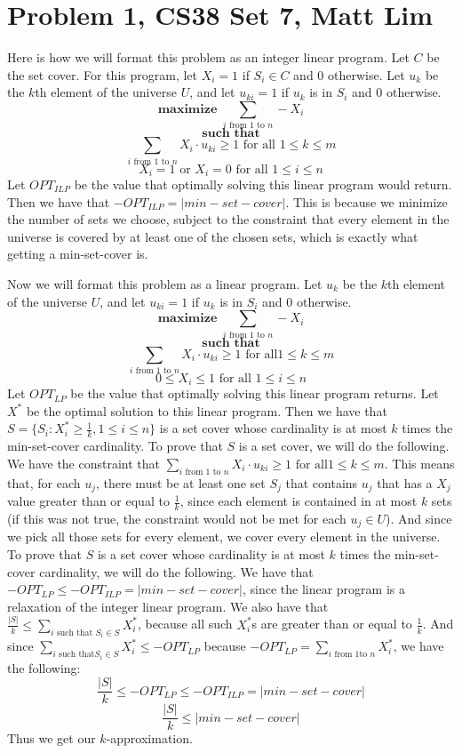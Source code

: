 \documentclass{article}
\begin{document}
\section*{Problem 1, CS38 Set 7, Matt Lim}
Here is how we will format this problem as an integer linear program. Let $C$ be
the set cover. For this
program, let $X_i = 1$ if $S_i \in C$ and $0$ otherwise. Let $u_k$ be the $k$th
element of the universe $U$, and let $u_{ki} = 1$
if $u_k$ is in $S_i$ and $0$ otherwise.
\[ \textbf{maximize } \sum_{i \text{ from $1$ to $n$}} -X_i \]
\[ \textbf{such that} \]
\[ \sum_{i \text{ from $1$ to $n$}} X_i \cdot u_{ki} \geq 1 \text{ for all $1
\leq k \leq m$} \]
\[ X_i = 1 \text{ or } X_i = 0 \text{ for all $1 \leq i \leq n$} \]
Let $OPT_{ILP}$ be the value that optimally solving this linear program would return. Then
we have that $-OPT_{ILP} = |min-set-cover|$. This is because we minimize the
number of sets we choose, subject to the constraint that every element in the
universe is covered by at least one of the chosen sets, which is exactly what getting a
min-set-cover is.

Now we will format this problem as a linear program. Let $u_k$ be the $k$th
element of the universe $U$, and let $u_{ki} = 1$
if $u_k$ is in $S_i$ and $0$ otherwise.
\[ \textbf{maximize } \sum_{i \text{ from $1$ to $n$}} -X_i \]
\[ \textbf{such that} \]
\[ \sum_{i \text{ from $1$ to $n$}} X_i \cdot u_{ki} \geq 1 \text{ for all
$1 \leq k \leq m$} \]
\[ 0 \leq X_i \leq 1 \text{ for all $1 \leq i \leq n$} \]
Let $OPT_{LP}$ be the value that optimally solving this linear program returns. Let $X^*$
be the optimal solution to this linear program. Then we have that
$S = \{S_i : X_i^* \geq \frac{1}{k}, 1 \leq i \leq n\}$ is a set cover whose cardinality
is at most $k$ times the min-set-cover cardinality. To prove that $S$ is a set
cover, we will do the following. We have the constraint that
$\sum_{i \text{ from $1$ to $n$}} X_i \cdot u_{ki} \geq 1 \text{ for all
$1 \leq k \leq m$}$. This means that, for each $u_j$, there must be at least one set
$S_j$ that contains $u_j$ that has a $X_j$ value greater than or equal to
$\frac{1}{k}$, since each element is contained in at most $k$ sets (if this was
not true, the constraint would not be met for each $u_j \in U$).
And since we pick all those sets for every element, we cover every element in the
universe. To prove that $S$ is a set cover whose cardinality is at most $k$
times the min-set-cover cardinality, we will do the following. We have that
$-OPT_{LP} \leq -OPT_{ILP} = |min-set-cover|$, since the linear program is a
relaxation of the integer linear program. We also have that $\frac{|S|}{k}
\leq \sum_{i \text{ such that $S_i \in S$}} X^*_i$, because all such $X^*_i$s
are greater than or equal to $\frac{1}{k}$. And since $\sum_{i \text{ such that
$S_i \in S$}} X^*_i \leq -OPT_{LP}$ because $-OPT_{LP} = \sum_{i \text{ from $1$
to $n$}} X^*_i$, we have the following:
\[ \frac{|S|}{k} \leq -OPT_{LP} \leq -OPT_{ILP} = |min-set-cover| \]
\[ \frac{|S|}{k} \leq |min-set-cover| \]
Thus we get our $k$-approximation.
\newpage
\end{document}
